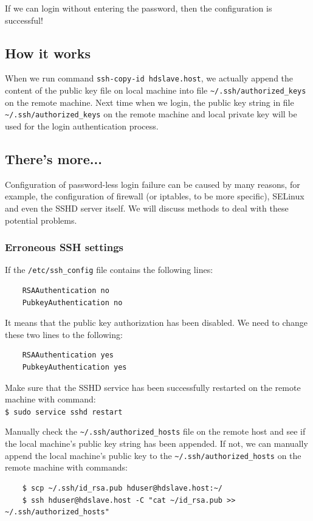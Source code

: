 If we can login without entering the password, then the configuration is successful!
\subsection*{How it works}
When we run command \verb|ssh-copy-id hdslave.host|, we actually append the content of the public key file on local machine into file \verb|~/.ssh/authorized_keys| on the remote machine. Next time when we login, the public key string in file \verb|~/.ssh/authorized_keys| on the remote machine and local private key will be used for the login authentication process.
\subsection*{There's more...}
Configuration of password-less login failure can be caused by many reasons, for example, the configuration of firewall (or iptables, to be more specific), SELinux and even the SSHD server itself. We will discuss methods to deal with these potential problems.
\subsubsection*{Erroneous SSH settings}
If the \verb|/etc/ssh_config| file contains the following lines:
\begin{verbatim}
    RSAAuthentication no
    PubkeyAuthentication no
\end{verbatim}

It means that the public key authorization has been disabled. We need to change these two lines to the following:
\begin{verbatim}
    RSAAuthentication yes
    PubkeyAuthentication yes
\end{verbatim}

Make sure that the SSHD service has been successfully restarted on the remote machine with command: \\
\verb|$ sudo service sshd restart|

Manually check the \verb|~/.ssh/authorized_hosts| file on the remote host and see if the local machine's public key string has been appended. If not, we can manually append the local machine's public key to the \verb|~/.ssh/authorized_hosts| on the remote machine with commands:
\begin{verbatim}
    $ scp ~/.ssh/id_rsa.pub hduser@hdslave.host:~/
    $ ssh hduser@hdslave.host -C "cat ~/id_rsa.pub >> ~/.ssh/authorized_hosts"
\end{verbatim}

